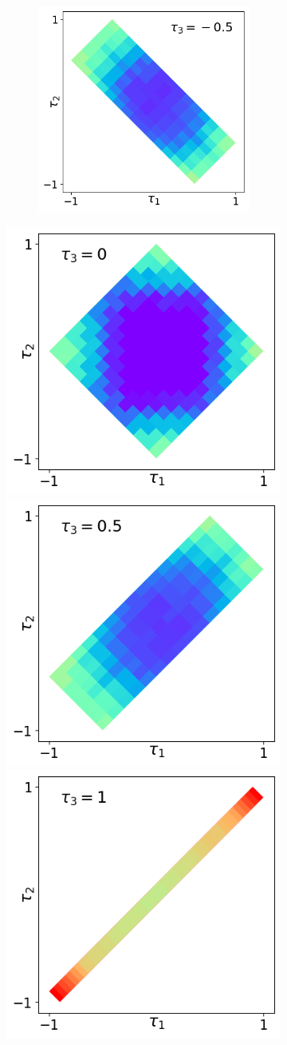 \documentclass[10pt,letterpaper]{article} %
\begin{document}
\begin{figure}
\begin{subfigure}{0.9\textwidth}
\begin{subfigure}{.333\textwidth}
\includegraphics[width=.95\columnwidth]{images/corte2-2.png} \\
\end{subfigure}
\includegraphics[width=.322\columnwidth]{images/corte3-2.png}
\includegraphics[width=.322\columnwidth]{images/corte4-2.png}
\includegraphics[width=.322\columnwidth]{images/corte5-2.png}

\end{subfigure}
\end{figure}
\end{document}
